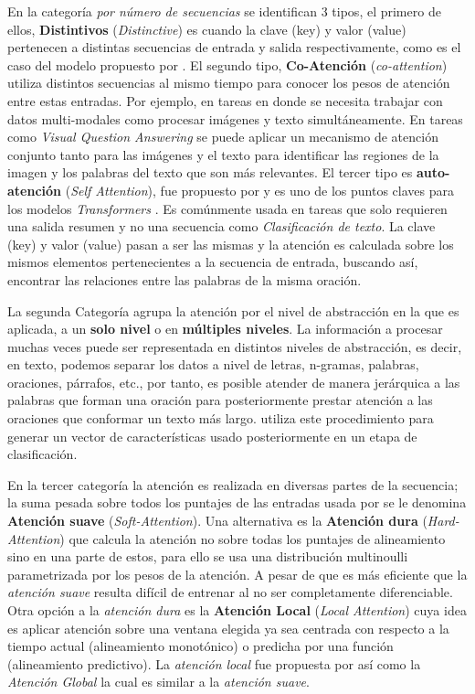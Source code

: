 En la categoría \textit{por número de secuencias} se identifican 3 tipos, el primero de ellos,
\textbf{Distintivos} (\textit{Distinctive}) es cuando la clave (key) y valor (value) pertenecen a
distintas secuencias de entrada y salida respectivamente, como es el caso del modelo propuesto por
\citeauthor{bahdanau2016neural}. El segundo tipo, \textbf{Co-Atención} (\textit{co-attention}) utiliza
distintos secuencias al mismo tiempo para conocer los pesos de atención entre estas entradas. Por ejemplo,
en tareas en donde se necesita trabajar con datos multi-modales como procesar imágenes y texto
simultáneamente. En tareas como \textit{Visual Question Answering}
se puede aplicar un mecanismo de atención conjunto tanto para las imágenes y el texto para identificar
las regiones de la imagen y los palabras del texto que son más relevantes. El
tercer tipo es \textbf{auto-atención} (\textit{Self Attention}), fue propuesto por \citeauthor{yang2016hierarchical} y es uno
de los puntos claves para los modelos \textit{Transformers} \cite{DBLP:journals/corr/VaswaniSPUJGKP17}.
Es comúnmente usada en tareas que solo requieren una salida resumen y no una secuencia como \textit{
Clasificación de texto}. La clave (key) y valor (value) pasan a ser las mismas y la atención es
calculada sobre los mismos elementos pertenecientes a la secuencia de entrada, buscando
así, encontrar las relaciones entre las palabras de la misma oración.

La segunda Categoría agrupa la atención por el nivel de abstracción en la que es aplicada, a un
\textbf{solo nivel} o en \textbf{múltiples niveles}. La información a procesar muchas veces puede ser
representada en distintos niveles de abstracción, es decir, en texto, podemos separar los datos a
nivel de letras, n-gramas, palabras, oraciones, párrafos, etc., por tanto, es posible atender
de manera jerárquica a las palabras que forman una oración para posteriormente prestar atención a
las oraciones que conformar un texto más largo. \citeauthor{yang2016hierarchical} utiliza este procedimiento
para generar un vector de características usado posteriormente en un etapa de clasificación.

En la tercer categoría la atención es realizada en diversas partes de la secuencia; la suma pesada sobre
todos los puntajes de las entradas usada por \citeauthor{bahdanau2016neural} se le denomina \textbf{
Atención suave} (\textit{Soft-Attention}). Una alternativa es la \textbf{Atención dura}
(\textit{Hard-Attention}) \cite{DBLP:journals/corr/XuBKCCSZB15} que calcula la atención no sobre todas
los puntajes de alineamiento sino en una parte de estos, para ello se usa una distribución multinoulli
parametrizada por los pesos de la atención. A pesar de que es más eficiente que la
\textit{atención suave} resulta difícil de entrenar al no ser completamente diferenciable. Otra opción
a la \textit{atención dura} es la \textbf{Atención Local} (\textit{Local Attention}) cuya idea es aplicar
atención sobre una ventana elegida ya sea centrada con respecto a la tiempo actual (alineamiento monotónico)
o predicha por una función (alineamiento predictivo). La \textit{atención local} fue propuesta por
\citeauthor{DBLP:journals/corr/LuongPM15} así como la \textit{Atención Global} la cual es similar a la
\textit{atención suave}.

